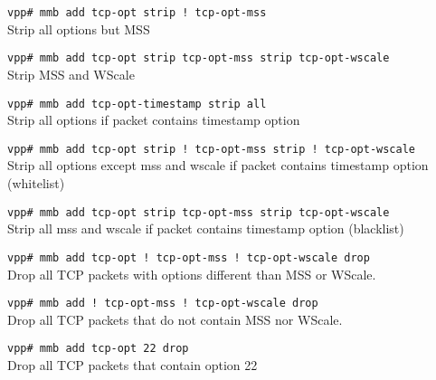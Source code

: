 \documentclass[a4paper,twoside,11pt]{report}
\begin{document}
\texttt{vpp\# mmb add tcp-opt strip !\ tcp-opt-mss} \\
   Strip all options but MSS

\texttt{vpp\# mmb add tcp-opt strip tcp-opt-mss strip tcp-opt-wscale} \\
   Strip MSS and WScale

\texttt{vpp\# mmb add tcp-opt-timestamp strip all} \\
   Strip all options if packet contains timestamp option

\texttt{vpp\# mmb add tcp-opt strip !\ tcp-opt-mss strip !\ tcp-opt-wscale} \\
   Strip all options except mss and wscale if packet contains timestamp option (whitelist)

\texttt{vpp\# mmb add tcp-opt strip tcp-opt-mss strip tcp-opt-wscale} \\
   Strip all mss and wscale if packet contains timestamp option (blacklist)

\texttt{vpp\# mmb add tcp-opt !\ tcp-opt-mss !\ tcp-opt-wscale  drop} \\
   Drop all TCP packets with options different than MSS or WScale.

\texttt{vpp\# mmb add !\ tcp-opt-mss !\ tcp-opt-wscale drop} \\
   Drop all TCP packets that do not contain MSS nor WScale.

\texttt{vpp\# mmb add tcp-opt 22 drop} \\
   Drop all TCP packets that contain option 22




\small

%
\end{document}
